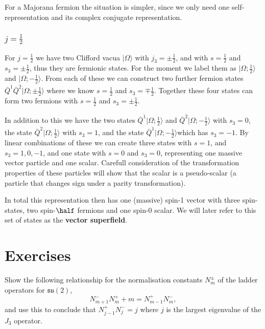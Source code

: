 \documentclass[notes.tex]{subfiles}
\begin{document}
For a Majorana fermion the situation is simpler, since we only need one self-representation and its complex conjugate representation. 

\subsubsection{$j=\frac{1}{2}$}
For $j=\frac{1}{2}$ we have two Clifford vacua $|\Omega\rangle $ with $j_3=\pm\frac{1}{2}$, and with $s=\frac{1}{2}$ and $s_3 = \pm\frac{1}{2}$, thus they are fermionic states. For the moment we label them as  $|\Omega; \frac{1}{2}\rangle$ and $|\Omega; -\frac{1}{2}\rangle$. From each of these we can construct two further fermion states $\bar{Q}^{\dot{1}}\bar{Q}^{\dot{2}}|\Omega;\pm \frac{1}{2}\rangle$ where we know $s=\frac{1}{2}$ and $s_3 = \mp\frac{1}{2}$.  Together these four states can form two fermions with $s = \frac{1}{2}$ and $s_3=\pm\frac{1}{2}$.

In addition to this we have the two states $\bar{Q}^{\dot{1}}|\Omega;\frac{1}{2}\rangle$ and $\bar{Q}^{\dot{2}}|\Omega; -\frac{1}{2}\rangle$ with $s_3 = 0$, the state $\bar{Q}^{\dot{2}}|\Omega;\frac{1}{2}\rangle$ with $s_3 = 1$, and the state $\bar{Q}^{\dot{1}}|\Omega;-\frac{1}{2}\rangle$which has $s_3 = -1$. By linear combinations of these we can create three states with $s=1$, and $s_3 = 1, 0, -1$, and one state with $s=0$ and $s_3=0$, representing one massive vector particle and one scalar. Carefull consideration of the transformation properties of these particles will show that the scalar is a pseudo-scalar (a particle that changes sign under a parity transformation).

In total this representation then has one (massive) spin-1 vector with three spin-states, two spin-$\half$ fermions and one spin-0 scalar. We will later refer to this set of states as the {\bf vector superfield}.




\section{Exercises}

\begin{Exercise}[label=ex:ladder_norm]
Show the following relationship for the normalisation constants $N_m^\pm$ of the ladder operators for $\mathfrak{su}(2)$,
\[ N_{m+1}^-N_m^++m=N_{m-1}^+N_m^-,\]
and use this to conclude that $N_{j-1}^+N_j^-=j$ where $j$ is the largest eigenvalue of the $J_3$ operator.
\end{Exercise}
\end{document}
